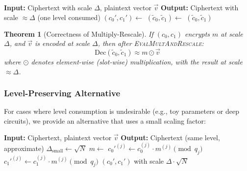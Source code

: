 \documentclass[11pt,a4paper]{article}
\newtheorem{theorem}{Theorem}
\begin{document}
\begin{algorithm}[H]
\caption{Complete Multiply and Rescale Pipeline}
\begin{algorithmic}[1]
    \State \textbf{Input:} Ciphertext with scale $\Delta$, plaintext vector $\vec{v}$
    \State \textbf{Output:} Ciphertext with scale $\approx \Delta$ (one level consumed)
    \State
    \State $(c_0', c_1') \gets$  
    \State $(\tilde{c}_0, \tilde{c}_1) \gets$  
    \State
    \State \Return $(\tilde{c}_0, \tilde{c}_1)$
\EndFunction
\end{algorithmic}
\end{algorithm}

\begin{theorem}[Correctness of Multiply-Rescale]
If $(c_0, c_1)$ encrypts $m$ at scale $\Delta$, and $\vec{v}$ is encoded at scale $\Delta$, then after \textsc{EvalMultAndRescale}:
\[
\text{Dec}(\tilde{c}_0, \tilde{c}_1) \approx m \odot \vec{v}
\]
where $\odot$ denotes element-wise (slot-wise) multiplication, with the result at scale $\approx \Delta$.
\end{theorem}

\subsubsection{Level-Preserving Alternative}

For cases where level consumption is undesirable (e.g., toy parameters or deep circuits), we provide an alternative that uses a small scaling factor:

\begin{algorithm}[H]
\caption{Level-Preserving Slot Multiplication}
\begin{algorithmic}[1]
    \State \textbf{Input:} Ciphertext, plaintext vector $\vec{v}$
    \State \textbf{Output:} Ciphertext (same level, approximate)
    \State
    \State {}
    \State $\Delta_{\text{small}} \gets \sqrt{N}$ 
    \State $m \gets$ 
    \State
    \State {}
        \State $c_0'^{(j)} \gets c_0^{(j)} \cdot m^{(j)} \pmod{q_j}$
        \State $c_1'^{(j)} \gets c_1^{(j)} \cdot m^{(j)} \pmod{q_j}$
    \EndFor
    \State
    \State \Return $(c_0', c_1')$ with scale $\Delta \cdot \sqrt{N}$
\EndFunction
\end{algorithmic}
\end{algorithm}
\end{document}
